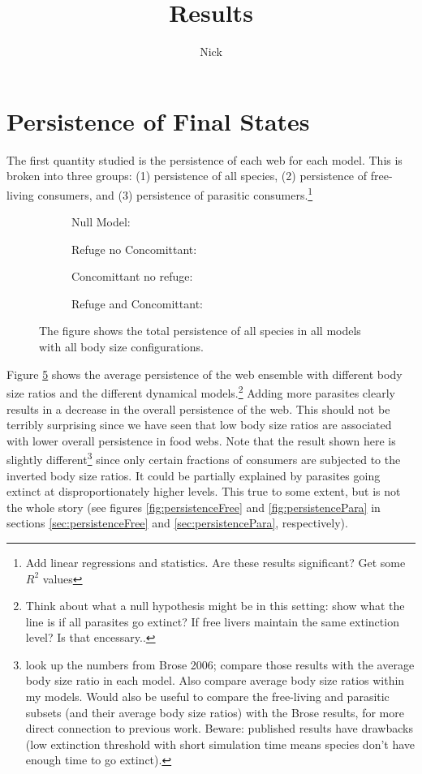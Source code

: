 \documentclass[11pt]{amsart}
\title{Results}
\author{Nick}
\begin{document}
\section{Persistence of Final States}
The first quantity studied is the persistence of each web for each model.  This is broken into three groups: (1) persistence of all species, (2) persistence of free-living consumers, and (3) persistence of parasitic consumers.\footnote{Add linear regressions and statistics.  Are these results significant?  Get some $R^2$ values}
\begin{figure}[h]
\begin{subfigure}[t]{.45\textwidth}
\caption{Null Model:\label{fig:persistenceAlla}}
\end{subfigure}
\begin{subfigure}[t]{.45\textwidth}
\caption{Refuge no Concomittant:\label{fig:persistenceAllb}}
\end{subfigure} 
\begin{subfigure}[ct]{.45\textwidth}
\caption{Concomittant no refuge:\label{fig:persistenceAllc}}
\end{subfigure}
\begin{subfigure}[ct]{.45\textwidth}
\caption{Refuge and Concomittant:\label{fig:persistenceAlld}}
\end{subfigure}
\caption{The figure shows the total persistence of all species in all models with all body size configurations.}
\label{fig:persistenceAll}
\end{figure}

Figure \ref{fig:persistenceAll} shows the average persistence of the web ensemble with different body size ratios and the different dynamical models.\footnote{Think about what a null hypothesis might be in this setting: show what the line is if all parasites go extinct?  If free livers maintain the same extinction level?  Is that encessary..}  Adding more parasites clearly results in a decrease in the overall persistence of the web.  This should not be terribly surprising since we have seen that low body size ratios are associated with lower overall persistence in food webs.  Note that the result shown here is slightly different\footnote{look up the numbers from Brose 2006; compare those results with the average body size ratio in each model.  Also compare average body size ratios within my models.  Would also be useful to compare the free-living and parasitic subsets (and their average body size ratios) with the Brose results, for more direct connection to previous work.  Beware: published results have drawbacks (low extinction threshold with short simulation time means species don't have enough time to go extinct).} since only certain fractions of consumers are subjected to the inverted body size ratios. It could be partially explained by parasites going extinct at disproportionately higher levels.  This true to some extent, but is not the whole story (see figures \ref{fig:persistenceFree} and \ref{fig:persistencePara} in sections \ref{sec:persistenceFree} and \ref{sec:persistencePara}, respectively).
\end{document}
